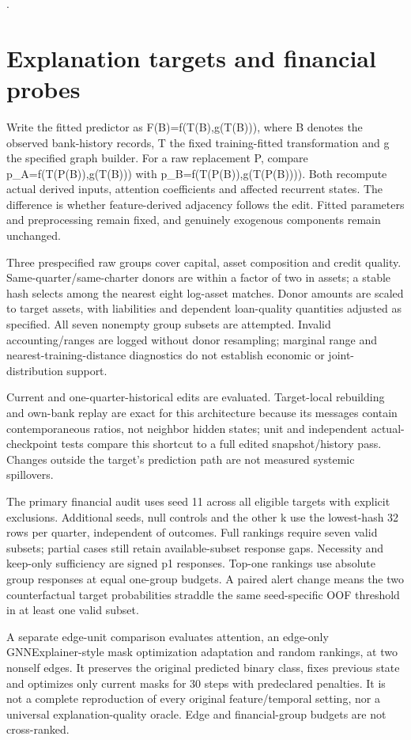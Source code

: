 \documentclass[11pt]{article}
\begin{document}
\citep{xgboost2016,gru2014,gat2018}.
\section{Explanation targets and financial probes}
Write the fitted predictor as F(B)=f(T(B),g(T(B))), where B denotes the observed bank-history records, T the fixed training-fitted transformation and g the specified graph builder. For a raw replacement P, compare p\_A=f(T(P(B)),g(T(B))) with p\_B=f(T(P(B)),g(T(P(B)))). Both recompute actual derived inputs, attention coefficients and affected recurrent states. The difference is whether feature-derived adjacency follows the edit. Fitted parameters and preprocessing remain fixed, and genuinely exogenous components remain unchanged.

Three prespecified raw groups cover capital, asset composition and credit quality. Same-quarter/same-charter donors are within a factor of two in assets; a stable hash selects among the nearest eight log-asset matches. Donor amounts are scaled to target assets, with liabilities and dependent loan-quality quantities adjusted as specified. All seven nonempty group subsets are attempted. Invalid accounting/ranges are logged without donor resampling; marginal range and nearest-training-distance diagnostics do not establish economic or joint-distribution support.

Current and one-quarter-historical edits are evaluated. Target-local rebuilding and own-bank replay are exact for this architecture because its messages contain contemporaneous ratios, not neighbor hidden states; unit and independent actual-checkpoint tests compare this shortcut to a full edited snapshot/history pass. Changes outside the target's prediction path are not measured systemic spillovers.

The primary financial audit uses seed 11 across all eligible targets with explicit exclusions. Additional seeds, null controls and the other k use the lowest-hash 32 rows per quarter, independent of outcomes. Full rankings require seven valid subsets; partial cases still retain available-subset response gaps. Necessity and keep-only sufficiency are signed p1 responses. Top-one rankings use absolute group responses at equal one-group budgets. A paired alert change means the two counterfactual target probabilities straddle the same seed-specific OOF threshold in at least one valid subset.

A separate edge-unit comparison evaluates attention, an edge-only GNNExplainer-style mask optimization adaptation and random rankings, at two nonself edges. It preserves the original predicted binary class, fixes previous state and optimizes only current masks for 30 steps with predeclared penalties. It is not a complete reproduction of every original feature/temporal setting, nor a universal explanation-quality oracle. Edge and financial-group budgets are not cross-ranked.
\end{document}
